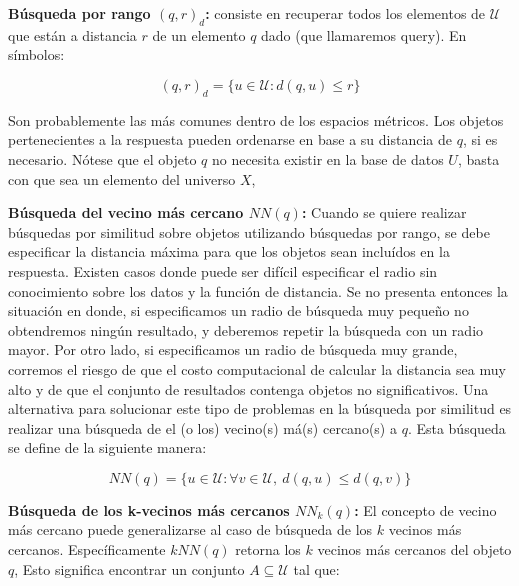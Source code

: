 \begin{description}
   \item {\textbf{B\'usqueda por rango $(q,r)_{d}$:}}
          consiste en recuperar todos los elementos  de $\mathcal{U}$
          que est\'an a distancia $r$ de un elemento $q$ dado (que llamaremos
          query).  En s\'imbolos:

           \vspace{-3mm}
          \[(q,r)_{d}=\{u \in \mathcal{U}:  d(q,u) \leq r\}\]
          
          Son probablemente las m\'as comunes dentro de los espacios
           m\'etricos.  Los objetos pertenecientes a la respuesta pueden 
           ordenarse en base a su distancia de $q$, si es necesario.
            N\'otese que el objeto $q$ no necesita existir en la base de datos $U$,
            basta con que sea un elemento del universo $X$, 

   \item{\textbf{ B\'usqueda del vecino m\'as cercano $NN(q)$:}}
         Cuando se quiere realizar b\'usquedas por similitud sobre objetos 
         utilizando b\'usquedas por rango, se debe especificar la distancia 
         m\'axima para que los objetos sean inclu\'idos en la respuesta. Existen 
         casos donde puede ser dif\'icil especificar el radio sin conocimiento
          sobre los datos y la funci\'on de distancia. 
          Se no presenta entonces la situaci\'on en donde, si especificamos 
          un radio de b\'usqueda muy peque\~no no obtendremos ning\'un resultado, 
          y deberemos repetir la b\'usqueda con un radio mayor. 
          Por otro lado, si especificamos un radio de b\'usqueda 
          muy grande, corremos el riesgo de que el costo computacional de calcular 
          la distancia sea muy alto y de que el conjunto de resultados contenga 
          objetos no significativos. 
          Una alternativa para solucionar este tipo de problemas en la b\'usqueda por
           similitud es realizar una b\'usqueda de el (o los)  vecino(s) m\'a(s) cercano(s)
           a $q$. Esta b\'usqueda se define de la siguiente manera:

          \vspace{-3mm}
          \[ NN(q)=\{u \in \mathcal{U} : \forall v \in \mathcal{U},
          \ d(q,u) \leq d(q,v)\}\]
          

   \item {\textbf{ B\'usqueda de los k-vecinos m\'as cercanos $NN_{k}(q)$:}}
         El concepto de vecino m\'as cercano puede generalizarse al caso 
         de b\'usqueda de los $k$ vecinos m\'as cercanos. Espec\'ificamente
          $kNN(q)$ retorna los $k$ vecinos m\'as cercanos del objeto $q$, 
          Esto significa encontrar un conjunto
          $A \subseteq \mathcal{U} $ tal que:


\end{description}
